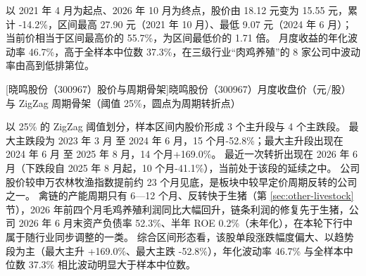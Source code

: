  以 2021 年 4 月为起点、2026 年 10 月为终点，股价由 18.12 元变为 15.55 元，累计 -14.2\%，区间最高 27.90 元（2021 年 10 月）、最低 9.07 元（2024 年 6 月）；当前价相当于区间最高价的 55.7\%，为区间最低价的 1.71 倍。 月度收益的年化波动率 46.7\%，高于全样本中位数 37.3\%，在三级行业“肉鸡养殖”的 8 家公司中波动率由高到低排第位。

\begin{center}
\begin{minipage}{\textwidth}\centering
{}

[晓鸣股份（300967）股价与周期骨架]{晓鸣股份（300967）月度收盘价（元/股）与 ZigZag 周期骨架（阈值 25\%，圆点为周期转折点）}
\end{minipage}
\end{center}

 以 25\% 的 ZigZag 阈值划分，样本区间内股价形成 3 个主升段与 4 个主跌段。 最大主跌段为 2023 年 3 月 至 2024 年 6 月，15 个月-52.8\%；最大主升段出现在 2024 年 6 月 至 2025 年 8 月，14 个月+169.0\%。 最近一次转折出现在 2026 年 6 月（下跌段自 2025 年 8 月起，10 个月-41.1\%），当前处于该段的延续之中。 公司股价较申万农林牧渔指数提前约 23 个月见底，是板块中较早定价周期反转的公司之一。 禽链的产能周期只有 6---12 个月、反转快于生猪（第 \ref{sec:other-livestock} 节），2026 年前四个月毛鸡养殖利润同比大幅回升，链条利润的修复先于生猪，公司 2026 年 6 月末资产负债率 52.3\%、半年 ROE 0.2\%（未年化），在本轮下行中属于随行业同步调整的一类。 综合区间形态看，该股单段涨跌幅度偏大、以趋势段为主（最大主升 +169.0\%、最大主跌 -52.8\%），年化波动率 46.7\% 与全样本中位数 37.3\% 相比波动明显大于样本中位数。

